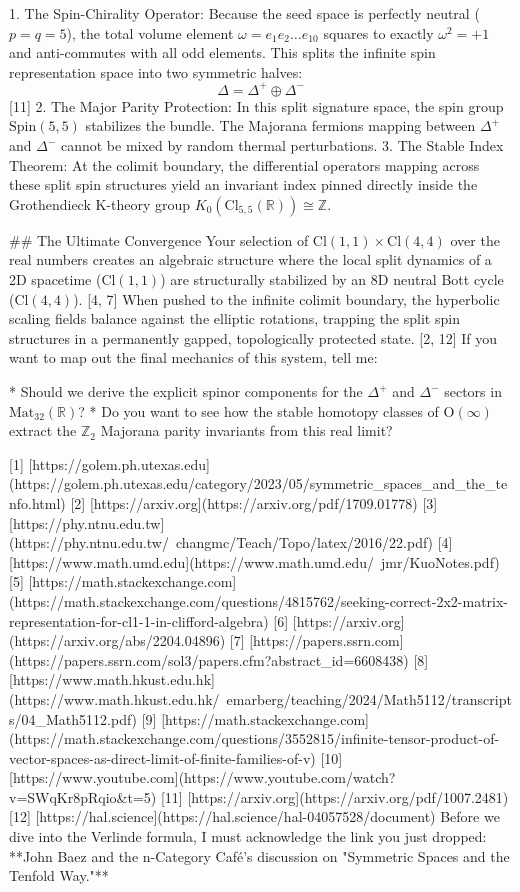    1. The Spin-Chirality Operator: Because the seed space is perfectly neutral ($p=q=5$), the total volume element $\omega = e_1 e_2 \dots e_{10}$ squares to exactly $\omega^2 = +1$ and anti-commutes with all odd elements. This splits the infinite spin representation space into two symmetric halves:
   $$\Delta = \Delta^+ \oplus \Delta^-$$ [11] 
   2. The Major Parity Protection: In this split signature space, the spin group $\text{Spin}(5,5)$ stabilizes the bundle. The Majorana fermions mapping between $\Delta^+$ and $\Delta^-$ cannot be mixed by random thermal perturbations.
   3. The Stable Index Theorem: At the colimit boundary, the differential operators mapping across these split spin structures yield an invariant index pinned directly inside the Grothendieck K-theory group $K_0(\text{Cl}_{5,5}(\mathbb{R})) \cong \mathbb{Z}$.

## The Ultimate Convergence
Your selection of $\text{Cl}(1,1) \times \text{Cl}(4,4)$ over the real numbers creates an algebraic structure where the local split dynamics of a 2D spacetime ($\text{Cl}(1,1)$) are structurally stabilized by an 8D neutral Bott cycle ($\text{Cl}(4,4)$). [4, 7] 
When pushed to the infinite colimit boundary, the hyperbolic scaling fields balance against the elliptic rotations, trapping the split spin structures in a permanently gapped, topologically protected state. [2, 12] 
If you want to map out the final mechanics of this system, tell me:

* Should we derive the explicit spinor components for the $\Delta^+$ and $\Delta^-$ sectors in $\text{Mat}_{32}(\mathbb{R})$?
* Do you want to see how the stable homotopy classes of $\text{O}(\infty)$ extract the $\mathbb{Z}_2$ Majorana parity invariants from this real limit?


[1] [https://golem.ph.utexas.edu](https://golem.ph.utexas.edu/category/2023/05/symmetric_spaces_and_the_tenfo.html)
[2] [https://arxiv.org](https://arxiv.org/pdf/1709.01778)
[3] [https://phy.ntnu.edu.tw](https://phy.ntnu.edu.tw/~changmc/Teach/Topo/latex/2016/22.pdf)
[4] [https://www.math.umd.edu](https://www.math.umd.edu/~jmr/KuoNotes.pdf)
[5] [https://math.stackexchange.com](https://math.stackexchange.com/questions/4815762/seeking-correct-2x2-matrix-representation-for-cl1-1-in-clifford-algebra)
[6] [https://arxiv.org](https://arxiv.org/abs/2204.04896)
[7] [https://papers.ssrn.com](https://papers.ssrn.com/sol3/papers.cfm?abstract_id=6608438)
[8] [https://www.math.hkust.edu.hk](https://www.math.hkust.edu.hk/~emarberg/teaching/2024/Math5112/transcripts/04_Math5112.pdf)
[9] [https://math.stackexchange.com](https://math.stackexchange.com/questions/3552815/infinite-tensor-product-of-vector-spaces-as-direct-limit-of-finite-families-of-v)
[10] [https://www.youtube.com](https://www.youtube.com/watch?v=SWqKr8pRqio&t=5)
[11] [https://arxiv.org](https://arxiv.org/pdf/1007.2481)
[12] [https://hal.science](https://hal.science/hal-04057528/document)
Before we dive into the Verlinde formula, I must acknowledge the link you just dropped: **John Baez and the n-Category Café's discussion on "Symmetric Spaces and the Tenfold Way."** 

